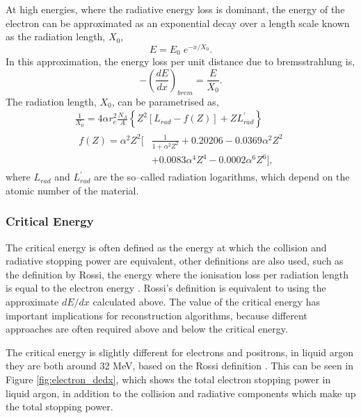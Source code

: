 At high energies, where the radiative energy loss is dominant, the energy of 
the electron can be approximated as an exponential decay over a length scale 
known as the radiation length, $X_0$,
\begin{equation*}
	E = E_0 \; e^{-x/X_0}.
\end{equation*}
In this approximation, the energy loss per unit distance due to bremsstrahlung 
is, 
\begin{equation*}
	- \left( \frac{dE}{dx} \right)_{brem} = \frac{E}{X_0}.
\end{equation*}
The radiation length, $X_0$, can be parametrised as,
\begin{equation}
	\begin{gathered}
		\frac{1}{X_0} = 4 \alpha r_e^2 \frac{N_A}{A} \left\{ Z^2 \left[L_{rad} - f(Z)\right] + Z
		L^\prime_{rad} \right\} \\
		\begin{aligned}
			f(Z) = \alpha^2 Z^2 \bigg[ &\frac{1}{1 + \alpha^2 Z^2} + 0.20206 - 0.0369
			\alpha^2 Z^2 \\ &+ 0.0083 \alpha^4 Z^4 -0.0002 \alpha^6 Z^6 \bigg],
		\end{aligned}
	\end{gathered}
	\label{eq:rad_length}
\end{equation}
where $L_{rad}$ and $L_{rad}^\prime$ are the so--called radiation logarithms,
which depend on the atomic number of the material\cite{Tsai:1973py}.

\subsubsection*{Critical Energy}
The critical energy is often defined as the energy at which the collision and 
radiative stopping power are equivalent, other definitions are also used, such
as the definition by Rossi, the energy where the ionisation loss per
radiation length is equal to the electron energy \cite{Rossi:1952kt}. Rossi's 
definition is equivalent to using the approximate $dE/dx$ calculated 
above\cite{PhysRevD.98.030001}. The value of the critical energy has important 
implications for reconstruction algorithms, because different approaches are 
often required above and below the critical energy. 

The critical energy is slightly different for electrons and positrons, in 
liquid argon they are both around 32 MeV, based on the Rossi definition 
\cite{pdg_atomictables}. This can be seen in Figure \ref{fig:electron_dedx}, 
which shows the total electron stopping power in liquid argon, in addition to 
the collision and radiative components which make up the total stopping 
power. 

